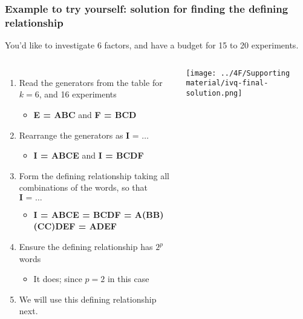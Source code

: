 \begin{frame}\frametitle{Example to try yourself: {\color{myOrange}solution} for finding the defining relationship}
	
	\vspace{0.5cm}
	You'd like to investigate 6 factors, and have a budget for 15 to 20 experiments.
	
	\vspace{0.5cm}
	\begin{columns}[T]
			\begin{enumerate}
				\item	Read the generators from the table for $k=6$, and 16 experiments
					\begin{itemize}
						\item	\textbf{E = ABC}	and  \textbf{F = BCD}
					\end{itemize}
				\item	Rearrange the generators as  $\textbf{I = \ldots}$
					\begin{itemize}
						\item	\textbf{I = ABCE}	and  \textbf{I = BCDF}
					\end{itemize}
			 	\item	Form the {\color{purple}defining relationship} taking all combinations of the words, so that $\textbf{I = \ldots}$
					\begin{itemize}
						\item	\textbf{I = ABCE = BCDF = A(BB)(CC)DEF = ADEF}
					\end{itemize}
			 	\item	Ensure the defining relationship has $2^p$ words
					\begin{itemize}
						\item	It does; since $p=2$ in this case
					\end{itemize} 
				\item	We will use this defining relationship next.
			\end{enumerate}
			
			\centerline{\texttt{[image: ../4F/Supporting material/ivq-final-solution.png]}}

	\end{columns}

	
\end{frame}
